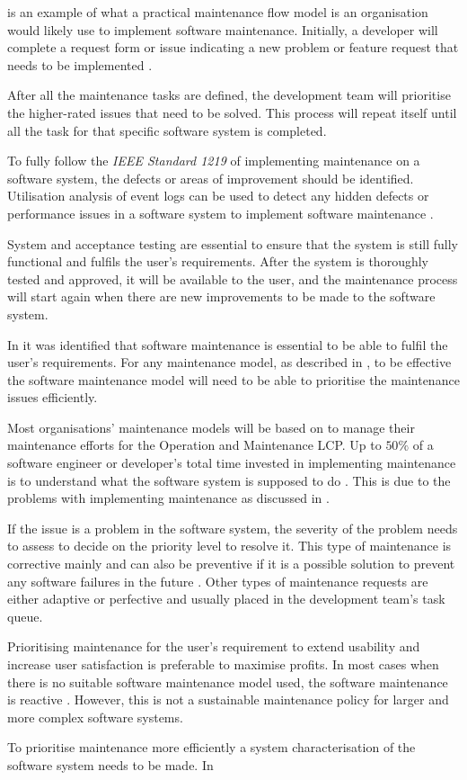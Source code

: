  is an example of what a practical maintenance flow model is an organisation would likely use to implement software maintenance. Initially, a developer will complete a request form or issue indicating a new problem or feature request that needs to be implemented \cite{Tang2010}.\par After all the maintenance tasks are defined, the development team will prioritise the higher-rated issues that need to be solved. This process will repeat itself until all the task for that specific software system is completed.\par To fully follow the \textit{IEEE Standard 1219} of implementing maintenance on a software system, the defects or areas of improvement should be identified. Utilisation analysis of event logs can be used to detect any hidden defects or performance issues in a software system to implement software maintenance \cite{Cinque2013, Rong2018a, Levin2019}.\par System and acceptance testing are essential to ensure that the system is still fully functional and fulfils the user's requirements. After the system is thoroughly tested and approved, it will be available to the user, and the maintenance process will start again when there are new improvements to be made to the software system.\par In  it was identified that software maintenance is essential to be able to fulfil the user's requirements. For any maintenance model, as described in , to be effective the software maintenance model will need to be able to prioritise the maintenance issues efficiently. \par Most organisations' maintenance models will be based on  to manage their maintenance efforts for the Operation and Maintenance LCP. Up to $50\%$ of a software engineer or developer's total time invested in implementing maintenance is to understand what the software system is supposed to do \cite{Tang2010}. This is due to the problems with implementing maintenance as discussed in .\par If the issue is a problem in the software system, the severity of the problem needs to assess to decide on the priority level to resolve it. This type of maintenance is corrective mainly and can also be preventive if it is a possible solution to prevent any software failures in the future \cite{Tang2010}. Other types of maintenance requests are either adaptive or perfective and usually placed in the development team's task queue. \par Prioritising maintenance for the user's requirement to extend usability and increase user satisfaction is preferable to maximise profits. In most cases when there is no suitable software maintenance model used, the software maintenance is reactive \cite{Araujo2021}. However, this is not a sustainable maintenance policy for larger and more complex software systems. \par To prioritise maintenance more efficiently a system characterisation of the software system needs to be made. In 